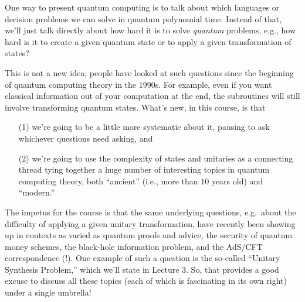 \documentclass[11pt]{report}
\theoremstyle{plain}
\theoremstyle{definition}
\begin{document}
One way to present quantum computing is to talk about which languages or decision problems we can solve in quantum polynomial time. Instead of that, we'll just talk directly about how hard it is to solve {\em quantum} problems, e.g., how hard is it to create a given quantum state or to apply a given transformation of states?

This is not a new idea; people have looked at such questions since the beginning of quantum computing theory in the 1990s. For example, even if you want classical information out of your computation at the end, the subroutines will still involve transforming quantum states.  What's new, in this course, is that
\begin{enumerate}
\item[(1)] we're going to be a little more systematic about it, pausing to ask whichever questions need asking, and
\item[(2)] we're going to use the complexity of states and unitaries as a connecting thread tying together a huge number of interesting topics in quantum computing theory, both ``ancient'' (i.e., more than $10$ years old) and ``modern.''
\end{enumerate}

The impetus for the course is that the same underlying questions, e.g.\ about the difficulty of applying a given unitary transformation, have recently been showing up in contexts as varied as quantum proofs and advice, the security of quantum money schemes, the black-hole information problem, and the AdS/CFT correspondence (!). One example of such a question is the so-called ``Unitary Synthesis Problem,'' which we'll state in Lecture 3.  So, that provides a good excuse to discuss all these topics (each of which is fascinating in its own right) under a single umbrella!
\end{document}
